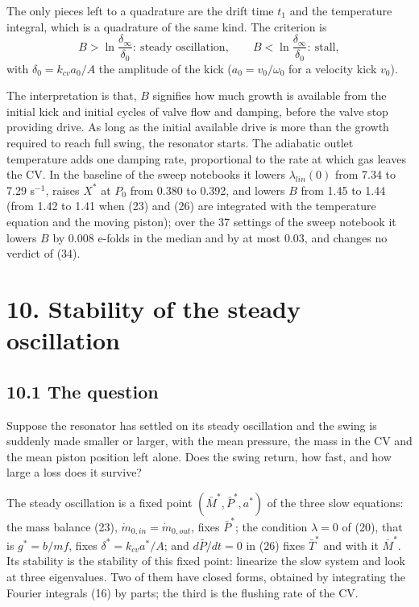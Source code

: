 \documentclass[11pt]{article}
\begin{document}
The only pieces left to a quadrature are the drift time $t_1$ and the temperature integral, which is a quadrature of the same kind. The criterion is
\begin{equation}
B > \ln\frac{\delta_\infty}{\delta_0}: \ \text{steady oscillation}, \qquad B < \ln\frac{\delta_\infty}{\delta_0}: \ \text{stall}, \tag{34}
\end{equation}
with $\delta_0 = k_{cv}a_0/A$ the amplitude of the kick ($a_0 = v_0/\omega_0$ for a velocity kick $v_0$).

The interpretation is that, $B$ signifies how much growth is available from the initial kick and initial cycles of valve flow and damping, before the valve stop providing drive. As long as the initial available drive is more than the growth required to reach full swing, the resonator starts. The adiabatic outlet temperature adds one damping rate, proportional to the rate at which gas leaves the CV. In the baseline of the sweep notebooks it lowers $\lambda_{lin}(0)$ from 7.34 to 7.29 s$^{-1}$, raises $X^*$ at $P_0$ from 0.380 to 0.392, and lowers $B$ from 1.45 to 1.44 (from 1.42 to 1.41 when (23) and (26) are integrated with the temperature equation and the moving piston); over the 37 settings of the sweep notebook it lowers $B$ by 0.008 e-folds in the median and by at most 0.03, and changes no verdict of (34).

\section*{10. Stability of the steady oscillation}

\subsection*{10.1 The question}

Suppose the resonator has settled on its steady oscillation and the swing is suddenly made smaller or larger, with the mean pressure, the mass in the CV and the mean piston position left alone. Does the swing return, how fast, and how large a loss does it survive?

The steady oscillation is a fixed point $(\bar M^*, \bar P^*, a^*)$ of the three slow equations: the mass balance (23), $\dot m_{0,in} = \dot m_{0,out}$, fixes $\bar P^*$; the condition $\lambda = 0$ of (20), that is $g^* = b/mf$, fixes $\delta^* = k_{cv}a^*/A$; and $d\bar P/dt = 0$ in (26) fixes $\bar T^*$ and with it $\bar M^*$. Its stability is the stability of this fixed point: linearize the slow system and look at three eigenvalues. Two of them have closed forms, obtained by integrating the Fourier integrals (16) by parts; the third is the flushing rate of the CV.
\end{document}

